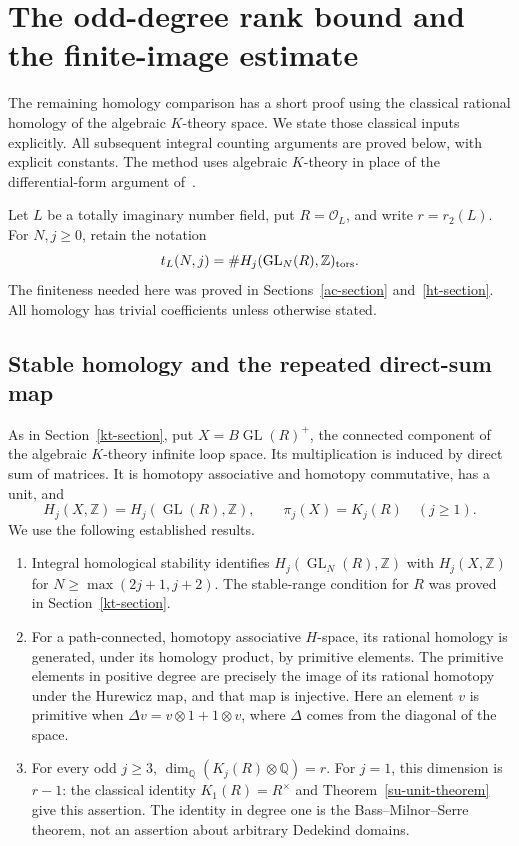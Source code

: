 \section{The odd-degree rank bound and the finite-image estimate}
\label{sb-section}

The remaining homology comparison has a short proof using the
classical rational homology of the algebraic \(K\)-theory space.
We state those classical inputs explicitly.  All subsequent
integral counting arguments are proved below, with explicit
constants.  The method uses algebraic \(K\)-theory in place of
the differential-form argument of~\cite{alpo-uniform-source}.

Let \(L\) be a totally imaginary number field, put
\(R=\mathcal O_L\), and write \(r=r_2(L)\).
For \(N,j\ge0\), retain the notation
\[
 t_L(N,j)=\#H_j(\operatorname{GL}_N(R),\mathbb Z)_{\rm tors}.
\]
The finiteness needed here was proved in
Sections~\ref{ac-section} and~\ref{ht-section}.
All homology has trivial coefficients unless otherwise stated.

\subsection{Stable homology and the repeated direct-sum map}

As in Section~\ref{kt-section}, put
\(X=B\operatorname{GL}(R)^+\), the connected component of the
algebraic \(K\)-theory infinite loop space.  Its multiplication
is induced by direct sum of matrices.  It is homotopy
associative and homotopy commutative, has a unit, and
\[
 H_j(X,\mathbb Z)=H_j(\operatorname{GL}(R),\mathbb Z),
 \qquad \pi_j(X)=K_j(R)\quad(j\ge1).
 \tag{SB1}
\]
We use the following established results.

\begin{enumerate}
\item Integral homological stability identifies
\(H_j(\operatorname{GL}_N(R),\mathbb Z)\) with
\(H_j(X,\mathbb Z)\) for
\(N\ge\max(2j+1,j+2)\).
The stable-range condition for \(R\) was proved in
Section~\ref{kt-section}.
\cite[IV, Corollary 1.14.1]{weibel-kbook}
\item For a path-connected, homotopy associative \(H\)-space,
its rational homology is generated, under its homology
product, by primitive elements.  The primitive elements
in positive degree are precisely the image of its rational
homotopy under the Hurewicz map, and that map is injective.
Here an element \(v\) is primitive when
\(\Delta v=v\otimes1+1\otimes v\), where \(\Delta\)
comes from the diagonal of the space.
\cite[Corollary 4.18, Theorem 5.18, and Appendix]{milnor-moore}
\item For every odd \(j\ge3\),
\(\dim_{\mathbb Q}(K_j(R)\otimes\mathbb Q)=r\).
For \(j=1\), this dimension is \(r-1\): the classical
identity \(K_1(R)=R^\times\) and
Theorem~\ref{su-unit-theorem} give this assertion.
The identity in degree one is the Bass--Milnor--Serre
theorem, not an assertion about arbitrary Dedekind domains.
\cite[III, Example 1.3.6; IV, Theorems 1.17--1.18]{weibel-kbook}
\end{enumerate}

